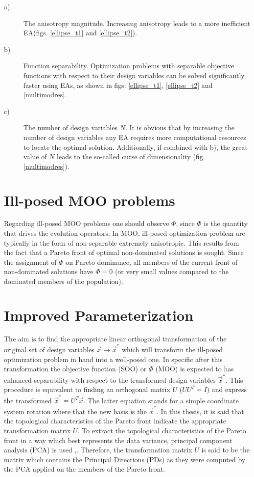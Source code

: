 \begin{description}
  \item[a)] The anisotropy magnitude. Increasing anisotropy leads to a more inefficient EA(figs. \ref{ellipse_t1} and \ref{ellipse_t2}).    
  \item[b)] Function separability. Optimization problems with separable objective functions with respect to their design variables can be solved significantly faster using EAs, as shown in figs. \ref{ellipse_t1}, \ref{ellipse_t2} and \ref{multimodres}.  
  \item[c)] The number of design variables $N$. It is obvious that by increasing the number of design variables any EA requires more computational resources to locate the optimal solution. Additionally, if combined with b), the great value of $N$ leads to the so-called curse of dimensionality (fig. \ref{multimodres}).  
\end{description}

\section{Ill-posed MOO problems}
\label{VCMM}
Regarding ill-posed MOO problems one should observe $\Phi$, since $\Phi$ is the quantity that drives the evolution operators. In MOO, ill-posed optimization problem are typically in the form of non-separable extremely anisotropic. This results from the fact that a Pareto front of optimal non-dominated solutions is sought. Since the assignment of $\Phi$ on Pareto dominance, all members of the current front of non-dominated solutions have $\Phi=0$ (or very small values compared to the dominated members of the population).

\section{Improved Parameterization}
The aim is to find the appropriate linear orthogonal transformation of the original set of design variables $\vec{x}  \rightarrow \vec{x}^*$ which will transform the ill-posed optimization problem in hand into a well-posed one. In specific after this transformation the objective function (SOO) or $\Phi$ (MOO) is expected to has enhanced separability with respect to the transformed design variables $\vec{x}^*$.  This procedure is equivalent to finding an orthogonal matrix $U$ ($UU^T=I$) and express the transformed $\vec{x}^*=U^T\vec{x}$. The latter equation stands for a simple coordinate system rotation where that the new basis is the $\vec{x}^*$. In this thesis, it is said that the topological characteristics of the Pareto front indicate the appropriate transformation matrix $U$.  To extract the topological characteristics of the Pareto front in a way which best represents the data variance, principal component analysis (PCA) is used ,\cite{Hayk1999,Jolliffe_2002}. Therefore, the transformation matrix $U$ is said to be the matrix which contains the Principal Directions (PDs) as they were computed by the PCA applied on the members of the Pareto front.   

